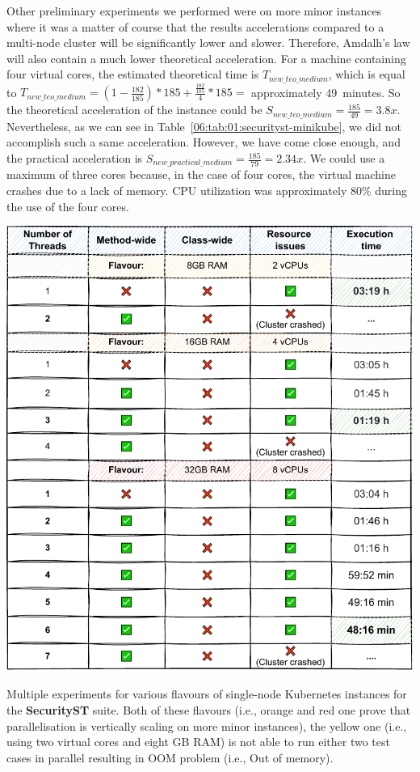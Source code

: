 Other preliminary experiments we performed were on more minor instances where it was a matter of course that the results
accelerations compared to a multi-node cluster will be significantly lower and slower.
Therefore, Amdalh's law will also contain a much lower theoretical acceleration.
For a machine containing four virtual cores, the estimated theoretical time is $T_{new\_teo\_medium}$, which is equal to
$T_{new\_teo\_medium} = (1 - \frac{182}{185}) * 185 + \frac{\frac{182}{185}} {4} * 185 = $ approximately 49~minutes.
So the theoretical acceleration of the instance could be $S_{new\_teo\_medium} = \frac{185}{49} = 3.8x$.
Nevertheless, as we can see in Table~\ref{06:tab:01:securityst-minikube}, we did not accomplish such a same acceleration.
However, we have come close enough, and the practical acceleration is $S_{new\_practical\_medium} = \frac{185}{79} = 2.34x$.
We could use a maximum of three cores because, in the case of four cores, the virtual machine crashes due to a lack of memory.
CPU utilization was approximately 80\% during the use of the four cores.
\begin{table}[ht!]
    \centering
    \includegraphics[scale=0.8]{obrazky-figures/08-experiments/preliminary/06-exp-preliminary-minikube-b}
    \caption{Multiple experiments for various flavours of single-node Kubernetes instances for the
    \textbf{SecurityST} suite. Both of these flavours (i.e., orange and red one prove that parallelisation is
    vertically scaling on more minor instances), the yellow one (i.e., using two virtual cores and eight GB RAM)
        is not able to run either two test cases in parallel resulting in OOM problem (i.e., Out of memory).}
    \label{06:tab:01:security-st-minikube}
\end{table}

